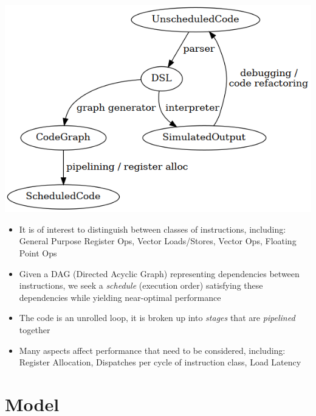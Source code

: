 \documentclass[a0,landscape,24pt]{a0poster}
\begin{document}
\begin{multicols}{3}
\begin{center}\vspace{1cm}
\includegraphics[width=1.0\linewidth,height=0.8\linewidth]{graph}
\end{center}\vspace{1cm}

\begin{itemize}
	\item It is of interest to distinguish between classes of instructions, including: {\color{red} General Purpose Register Ops}, {\color{Green} Vector Loads/Stores}, {\color{orange} Vector Ops}, {\color{blue} Floating Point Ops}
	\item Given a DAG (Directed Acyclic Graph) representing dependencies between instructions, we seek a {\it schedule} (execution order) satisfying these dependencies while yielding near-optimal performance
	\item The code is an unrolled loop, it is broken up into {\it stages} that are {\it pipelined} together
	\item Many aspects affect performance that need to be considered, including: Register Allocation, Dispatches per cycle of instruction class, Load Latency 
\end{itemize}

\color{DarkSlateGray} %

\section*{Model}


\end{multicols}
\end{document}
